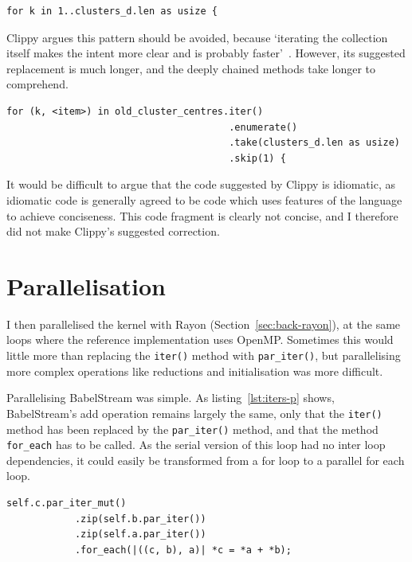 \begin{code}
\begin{verbatim}
for k in 1..clusters_d.len as usize {
\end{verbatim}
\label{lst:for-concise}
\end{code}
Clippy argues this pattern should be avoided, because `iterating the collection itself makes the intent more clear and is probably faster'~\cite{ClippyLoop}. However, its suggested replacement is much longer, and the deeply chained methods take longer to comprehend.
\begin{code}
\begin{verbatim}
for (k, <item>) in old_cluster_centres.iter()
                                       .enumerate()
                                       .take(clusters_d.len as usize)
                                       .skip(1) {
\end{verbatim}
\end{code}
It would be difficult to argue that the code suggested by Clippy is idiomatic, as idiomatic code is generally agreed to be code which uses features of the language to achieve conciseness. This code fragment is clearly not concise, and I therefore did not make Clippy's suggested correction.
\section{Parallelisation}
I then parallelised the kernel with Rayon (Section~\ref{sec:back-rayon}), at the same loops where the reference implementation uses OpenMP\@. Sometimes this would little more than replacing the \texttt{iter()} method with \texttt{par\_iter()}, but parallelising more complex operations like reductions and initialisation was more difficult.

Parallelising BabelStream was simple. As listing~\ref{lst:iters-p} shows, BabelStream's add operation remains largely the same, only that the \texttt{iter()} method has been replaced by the \texttt{par\_iter()} method, and that the method \texttt{for\_each} has to be called. As the serial version of this loop had no inter loop dependencies, it could easily be transformed from a for loop to a parallel for each loop.
\begin{code}
\begin{verbatim}
self.c.par_iter_mut()
            .zip(self.b.par_iter())
            .zip(self.a.par_iter())
            .for_each(|((c, b), a)| *c = *a + *b);
\end{verbatim}
\label{lst:iters-p}
\end{code}

